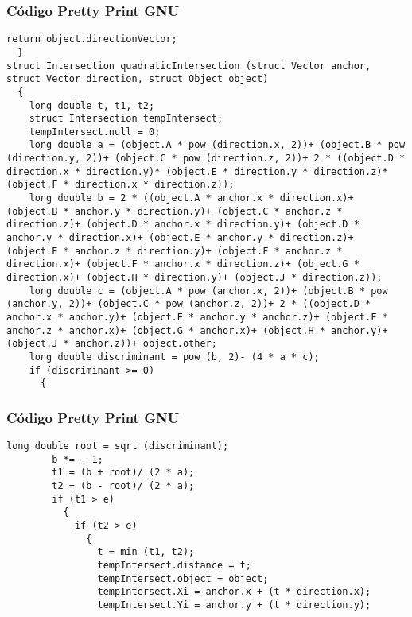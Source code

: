 \documentclass{beamer}
\begin{document}
\begin{frame}[fragile]
\frametitle{C\'odigo Pretty Print GNU}
\begin{lstlisting}[style=CStyle]
    return object.directionVector;
  }
struct Intersection quadraticIntersection (struct Vector anchor, struct Vector direction, struct Object object)
  {
    long double t, t1, t2;
    struct Intersection tempIntersect;
    tempIntersect.null = 0;
    long double a = (object.A * pow (direction.x, 2))+ (object.B * pow (direction.y, 2))+ (object.C * pow (direction.z, 2))+ 2 * ((object.D * direction.x * direction.y)* (object.E * direction.y * direction.z)* (object.F * direction.x * direction.z));
    long double b = 2 * ((object.A * anchor.x * direction.x)+ (object.B * anchor.y * direction.y)+ (object.C * anchor.z * direction.z)+ (object.D * anchor.x * direction.y)+ (object.D * anchor.y * direction.x)+ (object.E * anchor.y * direction.z)+ (object.E * anchor.z * direction.y)+ (object.F * anchor.z * direction.x)+ (object.F * anchor.x * direction.z)+ (object.G * direction.x)+ (object.H * direction.y)+ (object.J * direction.z));
    long double c = (object.A * pow (anchor.x, 2))+ (object.B * pow (anchor.y, 2))+ (object.C * pow (anchor.z, 2))+ 2 * ((object.D * anchor.x * anchor.y)+ (object.E * anchor.y * anchor.z)+ (object.F * anchor.z * anchor.x)+ (object.G * anchor.x)+ (object.H * anchor.y)+ (object.J * anchor.z))+ object.other;
    long double discriminant = pow (b, 2)- (4 * a * c);
    if (discriminant >= 0)
      {
        \end{lstlisting}
\end{frame}
\begin{frame}[fragile]
\frametitle{C\'odigo Pretty Print GNU}
\begin{lstlisting}[style=CStyle]
        long double root = sqrt (discriminant);
        b *= - 1;
        t1 = (b + root)/ (2 * a);
        t2 = (b - root)/ (2 * a);
        if (t1 > e)
          {
            if (t2 > e)
              {
                t = min (t1, t2);
                tempIntersect.distance = t;
                tempIntersect.object = object;
                tempIntersect.Xi = anchor.x + (t * direction.x);
                tempIntersect.Yi = anchor.y + (t * direction.y);
\end{lstlisting}
\end{frame}
\end{document}
